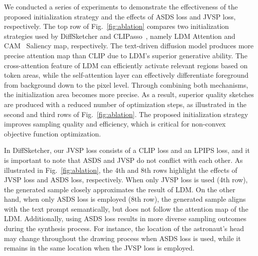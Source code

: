\documentclass{article}
\begin{document}
We conducted a series of experiments to demonstrate the effectiveness of the proposed initialization strategy and the effects of ASDS loss and JVSP loss, respectively. The top row of Fig.~\ref{fig:ablation} compares two initialization strategies used by DiffSketcher and CLIPasso~\cite {vinker_2022_clipasso}, namely LDM Attention and CAM~\cite {gradcam_selvaraju_2017} Saliency map, respectively. The text-driven diffusion model produces more precise attention map than CLIP due to LDM's superior generative ability. The cross-attention feature of LDM can efficiently activate relevant regions based on token areas, while the self-attention layer can effectively differentiate foreground from background down to the pixel level. Through combining both mechanisms, the initialization area becomes more precise. As a result, superior quality sketches are produced with a reduced number of optimization steps, as illustrated in the second and third rows of Fig.~\ref{fig:ablation}. The proposed initialization strategy improves sampling quality and efficiency, which is critical for non-convex objective function optimization. 

In DiffSketcher, our JVSP loss consists of a CLIP loss and an LPIPS loss, and it is important to note that ASDS and JVSP do not conflict with each other. As illustrated in Fig.~\ref{fig:ablation}, the 4th and 8th rows highlight the effects of JVSP loss and ASDS loss, respectively. When only JVSP loss is used (4th row), the generated sample closely approximates the result of LDM. On the other hand, when only ASDS loss is employed (8th row), the generated sample aligns with the text prompt semantically, but does not follow the attention map of the LDM. Additionally, using ASDS loss results in more diverse sampling outcomes during the synthesis process. For instance, the location of the astronaut's head may change throughout the drawing process when ASDS loss is used, while it remains in the same location when the JVSP loss is employed.
\end{document}
